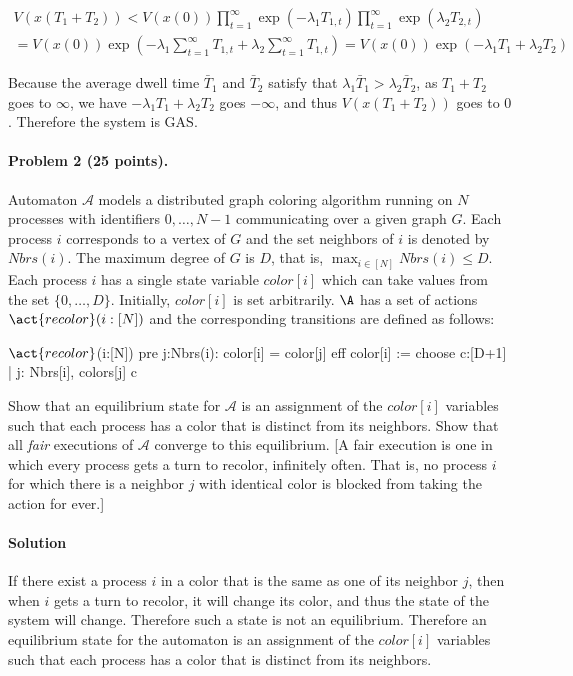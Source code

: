 \documentclass[11pt]{article}
\begin{document}
\begin{multline*}
V(x(T_1 + T_2)) < V(x(0))\prod\limits_{t=1}^{\infty}\exp(-\lambda_1 T_{1, t})\prod\limits_{t=1}^{\infty}\exp(\lambda_2 T_{2, t}) \\= V(x(0))\exp(-\lambda_1 \sum\limits_{t=1}^{\infty}T_{1, t} + \lambda_2 \sum\limits_{t=1}^{\infty}T_{1, t}) = V(x(0))\exp(-\lambda_1 T_1 + \lambda_2 T_2)
\end{multline*}

Because the average dwell time $\bar{T}_1$ and $\bar{T}_2$ satisfy that $\lambda_1 \bar{T}_1 > \lambda_2 \bar{T}_2$, as $T_1 + T_2$ goes to $\infty$, we have $-\lambda_1 T_1 + \lambda_2 T_2$ goes $-\infty$, and thus $V(x(T_1+T_2))$ goes to $0$. Therefore the system is GAS.

\paragraph{Problem 2 (25 points).}
	Automaton $\mathcal{A}$ models a distributed graph coloring algorithm running on $N$ processes with identifiers $0, \ldots, N-1$ communicating over a given graph $G$. Each process $i$ corresponds to a vertex of $G$ and  the set neighbors of $i$ is denoted by $\mathit{Nbrs}(i)$. The maximum degree of $G$ is $D$, that is, $\max_{i \in [N]} \mathit{Nbrs}(i) \leq D$. Each process $i$ has a single state variable $\mathit{color}[i]$ which can take values from the set $\{0, \ldots, D\}$. Initially, $\mathit{color}[i]$ is set arbitrarily. $\A$ has a set of actions $\act{recolor}(i:[N])$ and the corresponding transitions are defined as follows:
	\begin{IOA}
		$\act{recolor}$(i:[N])
		pre \E  j:Nbrs(i): color[i] = color[j]
		eff color[i] := choose {c:[D+1] |  j: Nbrs[i], colors[j] \ne c}
	\end{IOA}
	Show that an equilibrium state for $\mathcal{A}$ is an assignment of the $\mathit{color}[i]$ variables such that each process has a color that is distinct from its neighbors. Show that all {\em fair\/} executions of $\mathcal{A}$ converge to this equilibrium.
[A fair execution is one in which every process gets a turn to recolor, infinitely often. That is, no process $i$ for which there is a neighbor $j$ with identical color is blocked from taking the action for ever.]

\paragraph{Solution}
If there exist a process $i$ in a color that is the same as one of its neighbor $j$, then when $i$ gets a turn to recolor, it will change its color, and thus the state of the system will change. Therefore such a state is not an equilibrium. Therefore an equilibrium state for the automaton is an assignment of the $\mathit{color}[i]$ variables such that each process has a color that is distinct from its neighbors.
\end{document}

